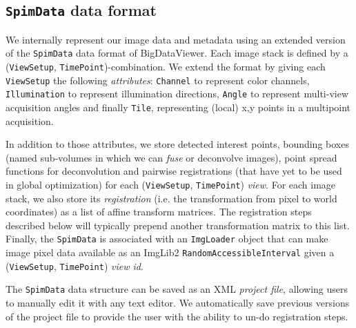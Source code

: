
\subsection*{\texttt{SpimData} data format}

We internally represent our image data and metadata using an extended version of the \texttt{SpimData} data format of BigDataViewer\cite{pietzsch2015bigdataviewer}. Each image stack is defined by a (\texttt{ViewSetup}, \texttt{TimePoint})-combination. We extend the format by giving each \texttt{ViewSetup} the following \emph{attributes}: \texttt{Channel} to represent color channels, \texttt{Illumination} to represent illumination directions, \texttt{Angle} to represent multi-view acquisition angles and finally \texttt{Tile}, representing (local) x,y points in a multipoint acquisition.

In addition to those attributes, we store detected interest points, bounding boxes (named sub-volumes in which we can \emph{fuse} or deconvolve images), point spread functions for deconvolution and pairwise registrations (that have yet to be used in global optimization) for each (\texttt{ViewSetup}, \texttt{TimePoint}) \emph{view}. For each image stack, we also store its \emph{registration} (i.e. the transformation from pixel to world coordinates) as a list of affine transform matrices. The registration steps described below will typically prepend another transformation matrix to this list. Finally, the \texttt{SpimData} is associated with an \texttt{ImgLoader} object that can make image pixel data available as an ImgLib2 \cite{imglib2} \texttt{RandomAccessibleInterval} given a  (\texttt{ViewSetup}, \texttt{TimePoint}) \emph{view id}.

The \texttt{SpimData} data structure can be saved as an XML \emph{project file}, allowing users to manually edit it with any text editor. We automatically save previous versions of the project file to provide the user with the ability to un-do registration steps.

